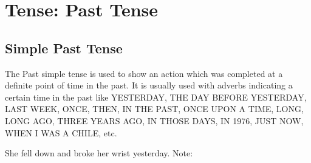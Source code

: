 \section{Tense: Past Tense}
\subsection{Simple Past Tense}
The Past simple tense is used to show an action which was completed at a
definite point of time in the past.
It is usually used with adverbs indicating a certain time in the past like
YESTERDAY, THE DAY BEFORE YESTERDAY, LAST WEEK, ONCE, THEN, IN THE PAST, ONCE
UPON A TIME, LONG, LONG AGO, THREE YEARS AGO, IN THOSE DAYS, IN 1976, JUST NOW,
WHEN I WAS A CHILE, etc.

She fell down and broke her wrist yesterday.
\newline
\newline
Note:
